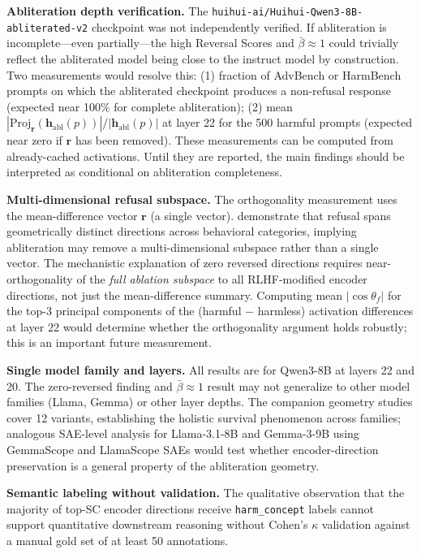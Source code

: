 \documentclass[11pt,letterpaper]{article}
\begin{document}
\textbf{Abliteration depth verification.} The \texttt{huihui-ai/Huihui-Qwen3-8B-abliterated-v2}
checkpoint was not independently verified. If abliteration is incomplete---even partially---the high
Reversal Scores and $\bar{\beta} \approx 1$ could trivially reflect the abliterated model being close
to the instruct model by construction. Two measurements would resolve this: (1) fraction of AdvBench
or HarmBench prompts on which the abliterated checkpoint produces a non-refusal response (expected
near 100\% for complete abliteration); (2) mean
$|\text{Proj}_{\mathbf{r}}(\mathbf{h}_{\text{abl}}(p))| / |\mathbf{h}_{\text{abl}}(p)|$ at layer 22
for the 500 harmful prompts (expected near zero if $\mathbf{r}$ has been removed). These measurements
can be computed from already-cached activations. Until they are reported, the main findings should be
interpreted as conditional on abliteration completeness.

\textbf{Multi-dimensional refusal subspace.} The orthogonality measurement uses the mean-difference
vector $\mathbf{r}$ (a single vector). \citet{Joad2026} demonstrate that refusal spans geometrically
distinct directions across behavioral categories, implying abliteration may remove a multi-dimensional
subspace rather than a single vector. The mechanistic explanation of zero reversed directions requires
near-orthogonality of the \emph{full ablation subspace} to all RLHF-modified encoder directions, not
just the mean-difference summary. Computing mean $|\cos\theta_f|$ for the top-3 principal components
of the (harmful $-$ harmless) activation differences at layer 22 would determine whether the
orthogonality argument holds robustly; this is an important future measurement.

\textbf{Single model family and layers.} All results are for Qwen3-8B at layers 22 and 20. The
zero-reversed finding and $\bar{\beta} \approx 1$ result may not generalize to other model families
(Llama, Gemma) or other layer depths. The companion geometry studies \citep{LlorenteSaguer2026a,LlorenteSaguer2026b}
cover 12 variants, establishing the holistic survival phenomenon across families; analogous SAE-level
analysis for Llama-3.1-8B and Gemma-3-9B using GemmaScope and LlamaScope SAEs would test whether
encoder-direction preservation is a general property of the abliteration geometry.

\textbf{Semantic labeling without validation.} The qualitative observation that the majority of
top-SC encoder directions receive \texttt{harm\_concept} labels cannot support quantitative downstream
reasoning without Cohen's $\kappa$ validation against a manual gold set of at least 50 annotations.
\end{document}
